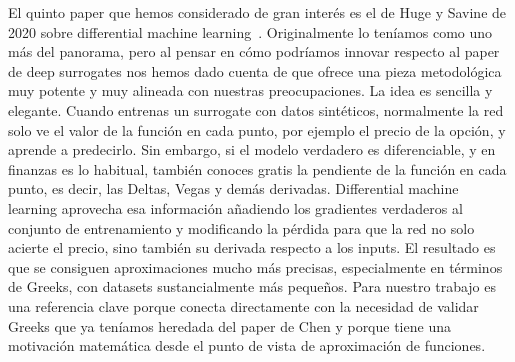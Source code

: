 \documentclass[11pt,a4paper]{article}
\begin{document}
El quinto paper que hemos considerado de gran interés es el de Huge y Savine de 2020 sobre differential machine learning~\cite{huge2020}. Originalmente lo teníamos como uno más del panorama, pero al pensar en cómo podríamos innovar respecto al paper de deep surrogates nos hemos dado cuenta de que ofrece una pieza metodológica muy potente y muy alineada con nuestras preocupaciones. La idea es sencilla y elegante. Cuando entrenas un surrogate con datos sintéticos, normalmente la red solo ve el valor de la función en cada punto, por ejemplo el precio de la opción, y aprende a predecirlo. Sin embargo, si el modelo verdadero es diferenciable, y en finanzas es lo habitual, también conoces gratis la pendiente de la función en cada punto, es decir, las Deltas, Vegas y demás derivadas. Differential machine learning aprovecha esa información añadiendo los gradientes verdaderos al conjunto de entrenamiento y modificando la pérdida para que la red no solo acierte el precio, sino también su derivada respecto a los inputs. El resultado es que se consiguen aproximaciones mucho más precisas, especialmente en términos de Greeks, con datasets sustancialmente más pequeños. Para nuestro trabajo es una referencia clave porque conecta directamente con la necesidad de validar Greeks que ya teníamos heredada del paper de Chen y porque tiene una motivación matemática desde el punto de vista de aproximación de funciones.
\end{document}

